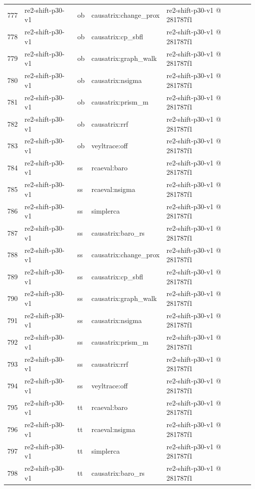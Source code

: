 \begin{longtable}{@{}r>{\raggedright\arraybackslash}p{87.0pt}>{\raggedright\arraybackslash}p{18.0pt}>{\raggedright\arraybackslash}p{63.0pt}>{\raggedright\arraybackslash}p{108.0pt}@{}}
777 & re2-shift-p30-v1 & ob & causatrix:change\_prox & re2-shift-p30-v1 @ 281787f1 \\
778 & re2-shift-p30-v1 & ob & causatrix:cp\_sbfl & re2-shift-p30-v1 @ 281787f1 \\
779 & re2-shift-p30-v1 & ob & causatrix:graph\_walk & re2-shift-p30-v1 @ 281787f1 \\
780 & re2-shift-p30-v1 & ob & causatrix:nsigma & re2-shift-p30-v1 @ 281787f1 \\
781 & re2-shift-p30-v1 & ob & causatrix:prism\_m & re2-shift-p30-v1 @ 281787f1 \\
782 & re2-shift-p30-v1 & ob & causatrix:rrf & re2-shift-p30-v1 @ 281787f1 \\
783 & re2-shift-p30-v1 & ob & veyltrace:off & re2-shift-p30-v1 @ 281787f1 \\
784 & re2-shift-p30-v1 & ss & rcaeval:baro & re2-shift-p30-v1 @ 281787f1 \\
785 & re2-shift-p30-v1 & ss & rcaeval:nsigma & re2-shift-p30-v1 @ 281787f1 \\
786 & re2-shift-p30-v1 & ss & simplerca & re2-shift-p30-v1 @ 281787f1 \\
787 & re2-shift-p30-v1 & ss & causatrix:baro\_rs & re2-shift-p30-v1 @ 281787f1 \\
788 & re2-shift-p30-v1 & ss & causatrix:change\_prox & re2-shift-p30-v1 @ 281787f1 \\
789 & re2-shift-p30-v1 & ss & causatrix:cp\_sbfl & re2-shift-p30-v1 @ 281787f1 \\
790 & re2-shift-p30-v1 & ss & causatrix:graph\_walk & re2-shift-p30-v1 @ 281787f1 \\
791 & re2-shift-p30-v1 & ss & causatrix:nsigma & re2-shift-p30-v1 @ 281787f1 \\
792 & re2-shift-p30-v1 & ss & causatrix:prism\_m & re2-shift-p30-v1 @ 281787f1 \\
793 & re2-shift-p30-v1 & ss & causatrix:rrf & re2-shift-p30-v1 @ 281787f1 \\
794 & re2-shift-p30-v1 & ss & veyltrace:off & re2-shift-p30-v1 @ 281787f1 \\
795 & re2-shift-p30-v1 & tt & rcaeval:baro & re2-shift-p30-v1 @ 281787f1 \\
796 & re2-shift-p30-v1 & tt & rcaeval:nsigma & re2-shift-p30-v1 @ 281787f1 \\
797 & re2-shift-p30-v1 & tt & simplerca & re2-shift-p30-v1 @ 281787f1 \\
798 & re2-shift-p30-v1 & tt & causatrix:baro\_rs & re2-shift-p30-v1 @ 281787f1 \\

\end{longtable}
